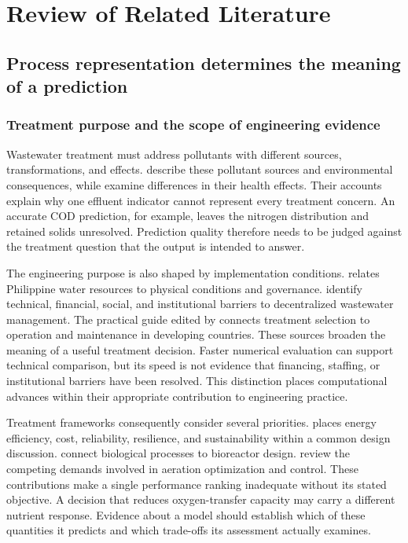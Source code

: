\chapter{Review of Related Literature}
\label{ch:literature}

\section{Process representation determines the meaning of a prediction}

\subsection{Treatment purpose and the scope of engineering evidence}

Wastewater treatment must address pollutants with different sources, transformations, and effects. \citet{Madhav2019} describe these pollutant sources and environmental consequences, while \citet{Lin2022} examine differences in their health effects. Their accounts explain why one effluent indicator cannot represent every treatment concern. An accurate COD prediction, for example, leaves the nitrogen distribution and retained solids unresolved. Prediction quality therefore needs to be judged against the treatment question that the output is intended to answer.

The engineering purpose is also shaped by implementation conditions. \citet{Tabios2020} relates Philippine water resources to physical conditions and governance. \citet{DamalerioBarriers2022} identify technical, financial, social, and institutional barriers to decentralized wastewater management. The practical guide edited by \citet{Ulrich2009} connects treatment selection to operation and maintenance in developing countries. These sources broaden the meaning of a useful treatment decision. Faster numerical evaluation can support technical comparison, but its speed is not evidence that financing, staffing, or institutional barriers have been resolved. This distinction places computational advances within their appropriate contribution to engineering practice.

Treatment frameworks consequently consider several priorities. \citet{Jafarinejad2020} places energy efficiency, cost, reliability, resilience, and sustainability within a common design discussion. \citet{Narayanan2019} connect biological processes to bioreactor design. \citet{Gu2023} review the competing demands involved in aeration optimization and control. These contributions make a single performance ranking inadequate without its stated objective. A decision that reduces oxygen-transfer capacity may carry a different nutrient response. Evidence about a model should establish which of these quantities it predicts and which trade-offs its assessment actually examines.

